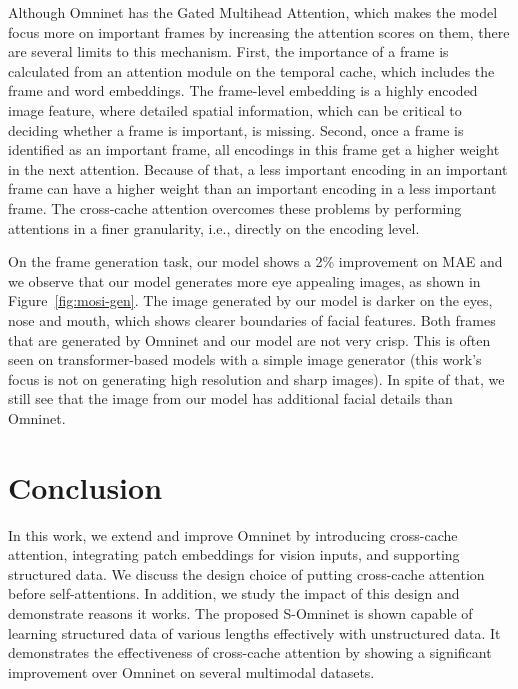 \documentclass{article}
\begin{document}
Although Omninet has the Gated Multihead Attention, which makes the model focus more on important frames by increasing the attention scores on them, there are several limits to this mechanism. First, the importance of a frame is calculated from an attention module on the temporal cache, which includes the frame and word embeddings. The frame-level embedding is a highly encoded image feature, where detailed spatial information, which can be critical to deciding whether a frame is important, is missing. Second, once a frame is identified as an important frame, all encodings in this frame get a higher weight in the next attention. Because of that, a less important encoding in an important frame can have a higher weight than an important encoding in a less important frame. The cross-cache attention overcomes these problems by performing attentions in a finer granularity, i.e., directly on the encoding level. 

On the frame generation task, our model shows a 2\% improvement on MAE and we observe that our model generates more eye appealing images, as shown in Figure~\ref{fig:mosi-gen}. The image generated by our model is darker on the eyes, nose and mouth, which shows clearer boundaries of facial features. Both frames that are generated by Omninet and our model are not very crisp. This is often seen on transformer-based models with a simple image generator \cite{jaegle2021perceiver} (this work's focus is not on generating high resolution and sharp images). In spite of that, we still see that the image from our model has additional facial details than Omninet. 


\section{Conclusion}\label{sec:conclusion}

In this work, we extend and improve Omninet by introducing cross-cache attention, integrating patch embeddings for vision inputs, and supporting structured data. We discuss the design choice of putting cross-cache attention before self-attentions. In addition, we study the impact of this design and demonstrate reasons it works. The proposed S-Omninet is shown capable of learning structured data of various lengths effectively with unstructured data. It demonstrates the effectiveness of cross-cache attention by showing a significant improvement over Omninet on several multimodal datasets. 



\end{document}
